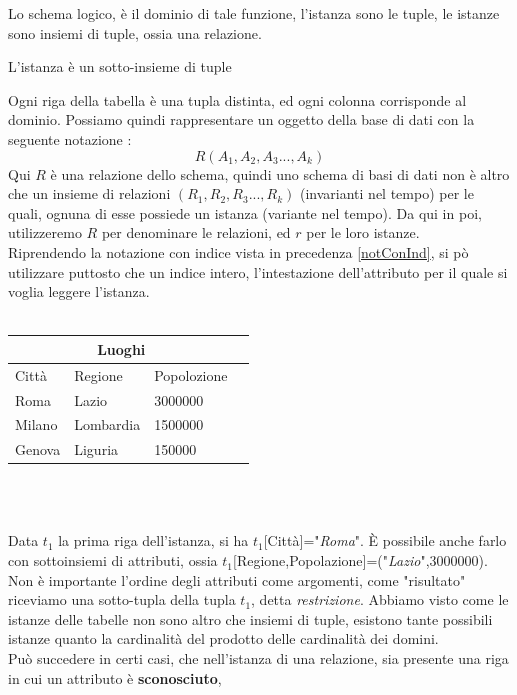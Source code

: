 \documentclass[12pt, letterpaper]{article}
\begin{document}
Lo schema logico, è il dominio di tale funzione, l'istanza sono le tuple, le istanze sono insiemi di tuple,
ossia una relazione.
\begin{theorem}
    L'istanza è un sotto-insieme di tuple
\end{theorem}
Ogni riga della tabella è una tupla distinta, ed ogni colonna corrisponde al dominio. Possiamo quindi rappresentare
un oggetto della base di dati con la seguente notazione : 
\begin{equation}
    R(A_1,A_2,A_3...,A_k)
\end{equation}
Qui \(R\) è una relazione dello schema, quindi uno schema di basi di dati non è altro che un 
insieme di relazioni \((R_1,R_2,R_3...,R_k)\) (invarianti nel tempo) per le quali, ognuna di esse possiede un istanza (variante nel tempo).
Da qui in poi, utilizzeremo \(R\) per denominare le relazioni, ed \(r\) per le loro istanze.\\
Riprendendo la notazione con indice vista in precedenza \ref{notConInd}, si pò utilizzare puttosto
che un indice intero, l'intestazione dell'attributo per il quale si voglia leggere l'istanza.\\
\centering
\hphantom{.}\\
\begin{tabular}{|l|l|l|r|}
    \hline
\multicolumn{3}{|c|}{\textbf{Luoghi}}\\
    \hline
    Città & Regione & Popolozione \\
    \hline
    Roma & Lazio & 3000000 \\
    \hline
    Milano & Lombardia & 1500000 \\
    \hline
    Genova & Liguria & 150000 \\
    \hline
    \end{tabular}
\\ 
 \hphantom{.}\\
 \raggedright
 Data \(t_1\) la prima riga dell'istanza, si ha \(t_1[\)Città\(]\)="\textit{Roma}". È possibile anche farlo
 con sottoinsiemi di attributi, ossia \(t_1[\)Regione,Popolazione\(]\)=("\textit{Lazio}",\(3000000\)). Non è importante
 l'ordine degli attributi come argomenti, come "risultato" riceviamo una sotto-tupla della tupla \(t_1\), detta \textit{restrizione}.
Abbiamo visto come le istanze delle tabelle non sono altro che insiemi di tuple, esistono tante possibili istanze quanto la cardinalità
del prodotto delle cardinalità dei domini.\\
Può succedere in certi casi, che nell'istanza di una relazione, sia presente una riga in cui un attributo è \textbf{sconosciuto},
\end{document}

